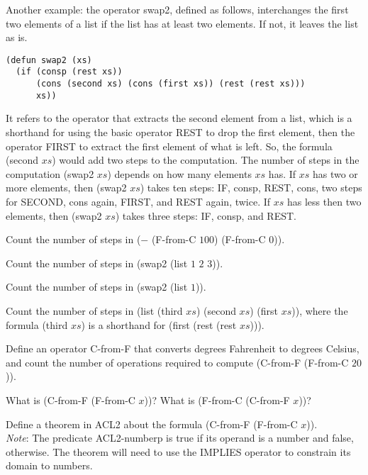 Another example:
the operator swap2, defined as follows, interchanges the
first two elements of a list if the list has at least two elements.
If not, it leaves the list as is.

\begin{Verbatim}
(defun swap2 (xs)
  (if (consp (rest xs))
      (cons (second xs) (cons (first xs)) (rest (rest xs)))
      xs))
\end{Verbatim}

It refers to the operator that extracts the second element from a list,
which is a shorthand for using the basic operator REST to drop the
first element, then the operator FIRST to extract the first element
of what is left.
\label{steps-in-second-op}
So, the formula (second $xs$) would add two steps
to the computation. The number of steps in the computation (swap2 $xs$)
depends on how many elements $xs$ has. If $xs$ has two or more elements,
then (swap2 $xs$) takes ten steps: IF, consp, REST, cons, two steps for SECOND,
cons again, FIRST, and REST again, twice.
If $xs$ has less then two elements, then (swap2 $xs$) takes three steps:
IF, consp, and REST.

\begin{ExerciseList}

\Exercise
Count the number of steps in ($-$ (F-from-C $100$) (F-from-C $0$)).

\Exercise
Count the number of steps in (swap2 (list $1$ $2$ $3$)).

\Exercise
Count the number of steps in (swap2 (list $1$)).

\Exercise
Count the number of steps in
(list (third $xs$) (second $xs$) (first $xs$)),
where the formula (third $xs$) is a shorthand for
(first (rest (rest $xs$))).

\Exercise
Define an operator C-from-F that converts degrees Fahrenheit
to degrees Celsius, and count the number of operations
required to compute (C-from-F (F-from-C $20$)).

\Exercise
What is (C-from-F (F-from-C $x$))?
What is (F-from-C (C-from-F $x$))?

\Exercise
Define a theorem in ACL2 about the formula (C-from-F (F-from-C $x$)). \\
\emph{Note}: The predicate ACL2-numberp is true if its operand is a number
and false, otherwise.
The theorem will need to use the IMPLIES operator to constrain its domain
to numbers.

\end{ExerciseList}

